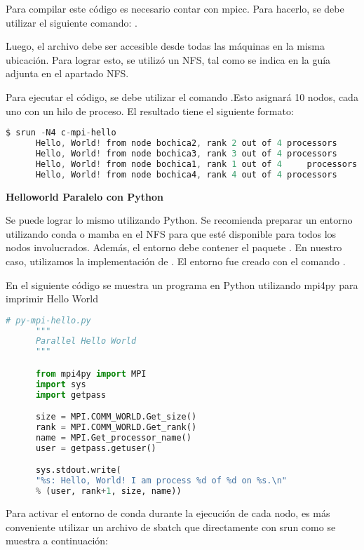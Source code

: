 \begin{spacing}{1.5}
  Para compilar este código es necesario contar con mpicc. Para hacerlo, se
  debe utilizar el siguiente comando: .

  Luego, el archivo debe ser accesible desde todas las máquinas en la misma
  ubicación. Para lograr esto, se utilizó un NFS, tal como se indica en la guía
  adjunta en el apartado NFS.

  Para ejecutar el código, se debe utilizar el comando .Esto asignará 10 nodos, cada uno con un hilo de proceso. El resultado tiene el siguiente formato:

  \begin{lstlisting}[language=C]
      $ srun -N4 c-mpi-hello
      Hello, World! from node bochica2, rank 2 out of 4 processors
      Hello, World! from node bochica3, rank 3 out of 4 processors
      Hello, World! from node bochica1, rank 1 out of 4     processors
      Hello, World! from node bochica4, rank 4 out of 4 processors
    \end{lstlisting}

  \textbf{Helloworld Paralelo con Python}

  Se puede lograr lo mismo utilizando Python. Se recomienda preparar un
  entorno utilizando conda o mamba en el NFS para que esté disponible para
  todos
  los nodos involucrados. Además, el entorno debe contener el paquete
  . En nuestro caso, utilizamos la implementación de .
  El entorno fue creado con el comando 
  .

  En el siguiente código se muestra un programa en Python utilizando mpi4py para imprimir Hello World

  \begin{lstlisting}[language=python]
      # py-mpi-hello.py
      """
      Parallel Hello World
      """

      from mpi4py import MPI
      import sys
      import getpass

      size = MPI.COMM_WORLD.Get_size()
      rank = MPI.COMM_WORLD.Get_rank()
      name = MPI.Get_processor_name()
      user = getpass.getuser()

      sys.stdout.write(
      "%s: Hello, World! I am process %d of %d on %s.\n"
      % (user, rank+1, size, name))

    \end{lstlisting}

  Para activar el entorno de conda durante la ejecución de cada nodo, es más conveniente utilizar un archivo de sbatch que directamente con srun como se muestra a continuación:


\end{spacing}
